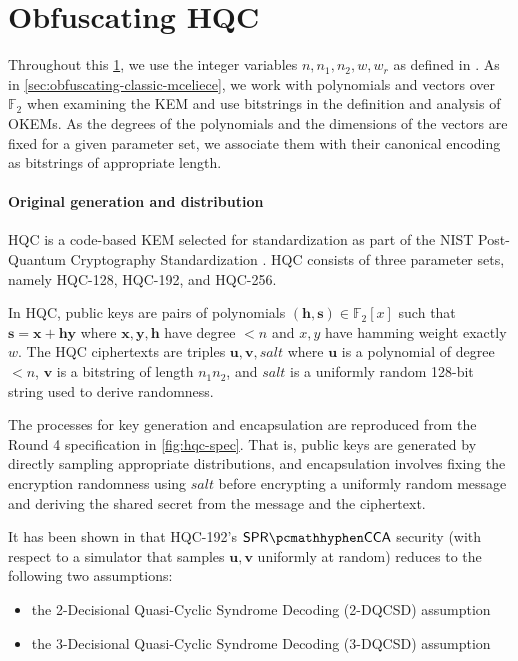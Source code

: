 \section{Obfuscating HQC} \label{sec:obfuscating-hqc}

Throughout this \cref{sec:obfuscating-hqc}, we use the integer variables $n, n_1, n_2, w, w_r$ as defined in \cite{NISTPQC-R4:HQC22}.
As in \cref{sec:obfuscating-classic-mceliece}, we work with polynomials and vectors over $\mathbb F_2$ when examining the KEM and use bitstrings in the definition and analysis of OKEMs. As the degrees of the polynomials and the dimensions of the vectors are fixed for a given parameter set, we associate them with their canonical encoding as bitstrings of appropriate length.

\paragraph{Original generation and distribution}
HQC is a code-based KEM selected for standardization as part of the NIST Post-Quantum Cryptography Standardization \cite{nist-standardization,nist-ir-8545}. HQC consists of three parameter sets, namely HQC-128, HQC-192, and HQC-256.
 
In HQC, public keys are pairs of polynomials $(\mathbf h, \mathbf s) \in \mathbb{F}_2[x]$ such that $\mathbf s = \mathbf x + \mathbf h \mathbf y$ where $\mathbf x,\mathbf y,\mathbf h$ have degree $<n$ and $x,y$ have hamming weight exactly $w$.
The HQC ciphertexts are triples $\mathbf u,\mathbf v,\mathit{salt}$ where $\mathbf u$ is a polynomial of degree $<n$, $\mathbf v$ is a bitstring of length $n_1n_2$, and $\mathit{salt}$ is a uniformly random 128-bit string used to derive randomness.

The processes for key generation and encapsulation are reproduced from the Round 4 specification \cite{NISTPQC-R4:HQC22} in \cref{fig:hqc-spec}. That is, public keys are generated by directly sampling appropriate distributions, and encapsulation involves fixing the encryption randomness using $\mathit{salt}$ before encrypting a uniformly random message and deriving the shared secret from the message and the ciphertext.

It has been shown in \cite[Lemma~P.2, Theorem~P.1]{EC:Xagawa22} that HQC-192's $\sprcca$ security (with respect to a simulator that samples $\mathbf u,\mathbf v$ uniformly at random) reduces to the following two assumptions:
\begin{itemize}
    \item the 2-Decisional Quasi-Cyclic Syndrome Decoding (2-DQCSD) assumption \cite[Definition~2.1.15]{NISTPQC-R4:HQC22}
    \item the 3-Decisional Quasi-Cyclic Syndrome Decoding (3-DQCSD) assumption \cite[Definition~2.1.17]{NISTPQC-R4:HQC22}
\end{itemize}


